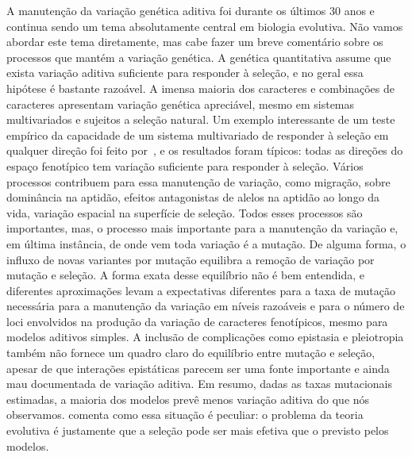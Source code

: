 \begin{refsection}
A manutenção da variação genética aditiva foi durante os últimos 30 anos e
continua sendo um tema absolutamente central em biologia evolutiva. Não vamos
abordar este tema diretamente, mas cabe fazer um breve comentário sobre os
processos que mantém a variação genética. A genética quantitativa assume que
exista variação aditiva suficiente para responder à seleção, e no geral essa
hipótese é bastante razoável. A imensa maioria dos caracteres e combinações de
caracteres apresentam variação genética apreciável, mesmo em sistemas
multivariados e sujeitos a seleção natural. Um exemplo interessante de um
teste empírico da capacidade de um sistema multivariado de responder à seleção
em qualquer direção foi feito por~\textcite{Hine2014-ps}, e os resultados
foram típicos: todas as direções do espaço fenotípico tem variação suficiente
para responder à seleção. Vários processos contribuem para essa manutenção de
variação, como migração, sobre dominância na aptidão, efeitos antagonistas de
alelos na aptidão ao longo da vida, variação espacial na superfície de
seleção. Todos esses processos são importantes, mas, o processo mais
importante para a manutenção da variação e, em última instância, de onde vem
toda variação é a mutação. De alguma forma, o influxo de novas variantes por
mutação equilibra a remoção de variação por mutação e seleção. A forma exata
desse equilíbrio não é bem entendida, e diferentes aproximações levam a
expectativas diferentes para a taxa de mutação necessária para a manutenção da
variação em níveis razoáveis e para o número de loci envolvidos na produção da
variação de caracteres fenotípicos, mesmo para modelos aditivos simples. A
inclusão de complicações como epistasia e pleiotropia também não fornece um
quadro claro do equilíbrio entre mutação e seleção, apesar de que interações
epistáticas parecem ser uma fonte importante e ainda mau documentada de
variação aditiva. Em resumo, dadas as taxas mutacionais estimadas, a maioria
dos modelos prevê menos variação aditiva do que nós observamos.
\textcite{Rice2004-jf} comenta como essa situação é peculiar: o problema da
teoria evolutiva é justamente que a seleção pode ser mais efetiva que o
previsto pelos modelos.


\end{refsection}
